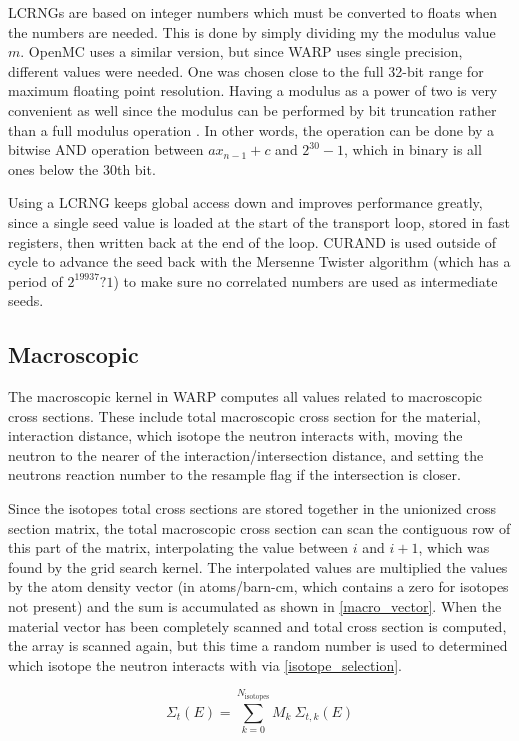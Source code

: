 LCRNGs are based on integer numbers which must be converted to floats when the numbers are needed.  This is done by simply dividing my the modulus value $m$.  OpenMC uses a similar version, but since WARP uses single precision, different values were needed.   One was chosen close to the full 32-bit range for maximum floating point resolution.  Having a modulus as a power of two is very convenient as well since the modulus can be performed by bit truncation rather than a full modulus operation \cite{openmc}.  In other words, the operation can be done by a bitwise AND operation between $a x_{n-1} + c$ and $2^{30}-1$, which in binary is all ones below the 30th bit.

Using a LCRNG keeps global access down and improves performance greatly, since a single seed value is loaded at the start of the transport loop, stored in fast registers, then written back at the end of the loop.  CURAND is used outside of cycle to advance the seed back with the Mersenne Twister algorithm (which has a period of $2^{19937} ? 1$) to make sure no correlated numbers are used as intermediate seeds.

\subsection{Macroscopic}

The macroscopic kernel in WARP computes all values related to macroscopic cross sections.  These include total macroscopic cross section for the material, interaction distance, which isotope the neutron interacts with, moving the neutron to the nearer of the interaction/intersection distance, and setting the neutrons reaction number to the resample flag if the intersection is closer.  

Since the isotopes total cross sections are stored together in the unionized cross section matrix, the total macroscopic cross section can scan the contiguous row of this part of the matrix, interpolating the value between $i$ and $i+1$, which was found by the grid search kernel.  The interpolated values are multiplied the values by the atom density vector (in atoms/barn-cm, which contains a zero for isotopes not present) and the sum is accumulated as shown in \eqref{macro_vector}.  When the material vector has been completely scanned and total cross section is computed, the array is scanned again, but this time a random number is used to determined which isotope the neutron interacts with via \eqref{isotope_selection}.

\begin{equation}
\Sigma_t(E) = \sum_{k=0}^{N_\mathrm{isotopes}} M_k \: \Sigma_{t,k}(E)
\label{macro_vector}
\end{equation}

